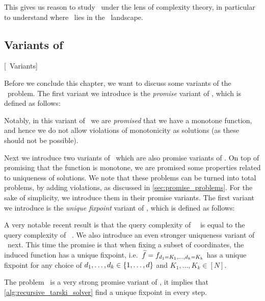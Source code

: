 This gives us reason to study \Tarski\ under the lens of complexity theory, in particular to understand where \Tarski\ lies in the \TFNP\ landscape.

\subsection{Variants of \Tarski}[\Tarski\ Variants]

Before we conclude this chapter, we want to discuss some variants of the \Tarski\ problem. The first variant we introduce is the \emph{promise} variant of \Tarski, which is defined as follows:


Notably, in this variant of \Tarski\ we are \emph{promised} that we have a monotone function, and hence we do not allow violations of monotonicity as solutions (as these should not be possible).

Next we introduce two variants of \Tarski\ which are also promise variants of \Tarski. On top of promising that the function is monotone, we are promised some properties related to uniqueness of solutions. We note that these problems can be turned into total problems, by adding violations, as discussed in \cref{sec:promise_problems}. For the sake of simplicity, we introduce them in their promise variants. The first variant we introduce is the \emph{unique fixpoint} variant of \Tarski, which is defined as follows:


A very notable recent result is that the query complexity of \SuperUniqueTarski\, \UniqueTarski\ is equal to the query complexity of \Tarski~.  We also introduce an even stronger uniqueness variant of \Tarski\ next. This time the promise is that when fixing a subset of coordinates, the induced function has a unique fixpoint, i.e.\ $\widetilde{f} = f_{d_1=K_1, \dots, d_k=K_k}$ has a unique fixpoint for any choice of $d_1, \dots, d_k \in \left\{1, \dots, d\right\}$ and $K_1, \dots, K_k \in [N]$.


The problem \SuperUniqueTarski\ is a very strong promise variant of \Tarski, it implies that \cref{alg:recursive_tarski_solver} find a unique fixpoint in every step.